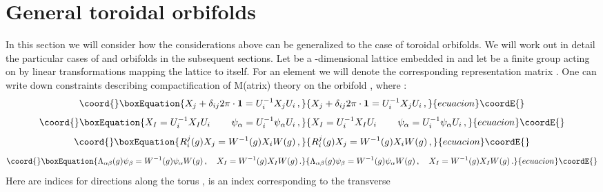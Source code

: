 \documentclass[a4paper,a4paper]{article}
\begin{document}
\section{General toroidal orbifolds}
In this section we will consider  how the considerations above can be generalized to the case of  toroidal orbifolds. 
We will work out in detail the particular cases of \coordHE{} and \coordHE{} orbifolds in the subsequent sections. 
Let \coordHE{} be a \coordHE{}-dimensional lattice  embedded in \coordHE{} and let \coordHE{} be a finite 
group acting on   \coordHE{} by linear transformations mapping the lattice \coordHE{} to itself. 
For an element \coordHE{} we will denote the corresponding representation matrix \coordHE{}.
One can write down constraints describing compactification of M(atrix) theory on the orbifold \coordHE{}, 
where \coordHE{}: 
\begin{equation}\coord{}\boxEquation{ \label{e1}
X_{j} + \delta_{ij}2\pi \cdot {\bf 1} = U_{i}^{-1}X_{j}U_{i} \, , 
}{ X_{j} + \delta_{ij}2\pi \cdot {\bf 1} = U_{i}^{-1}X_{j}U_{i} \, , 
}{ecuacion}\coordE{}\end{equation}
\begin{equation}\coord{}\boxEquation{ \label{eq1'}
  X_{I} = U_{i}^{-1}X_{I}U_{i} \, \qquad \psi_{\alpha} = U_{i}^{-1}\psi_{\alpha}U_{i} \, ,
}{ X_{I} = U_{i}^{-1}X_{I}U_{i} \, \qquad \psi_{\alpha} = U_{i}^{-1}\psi_{\alpha}U_{i} \, ,
}{ecuacion}\coordE{}\end{equation}
\begin{equation}\coord{}\boxEquation{ \label{e2}
R_{i}^{j}(g)X_{j} = W^{-1}(g)X_{i}W(g) \, , 
}{ R_{i}^{j}(g)X_{j} = W^{-1}(g)X_{i}W(g) \, , 
}{ecuacion}\coordE{}\end{equation}
\begin{equation}\coord{}\boxEquation{ \label{eq2'}
 \Lambda_{\alpha \beta}(g)\psi_{\beta} = W^{-1}(g)\psi_{\alpha}W(g) \, , \quad X_{I} = W^{-1}(g) X_{I} W(g) \, . 
}{ \Lambda_{\alpha \beta}(g)\psi_{\beta} = W^{-1}(g)\psi_{\alpha}W(g) \, , \quad X_{I} = W^{-1}(g) X_{I} W(g) \, . 
}{ecuacion}\coordE{}\end{equation}
Here  \coordHE{} are indices for directions along the torus , \coordHE{} is an index corresponding to  the transverse 
\end{document}
